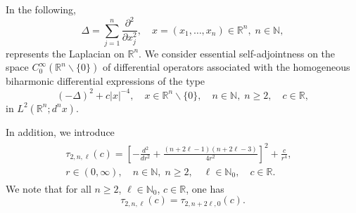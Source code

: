 \documentclass[reqno,11pt,centertags]{amsart}
\newcommand{\bbN}{{\mathbb{N}}}
\newcommand{\bbR}{{\mathbb{R}}}
\newcommand{\<}{\langle}
\renewcommand{\>}{\rangle}
\newcommand{\lb}{\label}
\numberwithin{equation}{section}
\theoremstyle{definition}
\begin{document}
In the following, 
\begin{equation}
\Delta= \sum_{j=1}^n \frac{\partial^2}{\partial x_j^2}, \quad x=(x_1,\ldots,x_n) \in \bbR^n,\; n\in \bbN,
\end{equation}
represents the  Laplacian on $\bbR^n$.
We consider essential self-adjointness on the space $C_0^{\infty}(\bbR^n \backslash \{0\})$
of differential operators associated with the homogeneous biharmonic differential expressions  of the type
\begin{equation}
(-\Delta)^2 +c|x|^{-4}, \quad x\in \bbR^n \backslash \{0\}, \quad n \in \bbN, \; n\geq 2,\quad  c\in \bbR, 
\end{equation}
in $L^2(\bbR^n;d^nx)$. 

In addition, we introduce 
\begin{align} \lb{E:tau_nl}
\begin{split} 
\tau_{2,n,\ell}(c)= \left[- \frac{d^2}{dr^2} + \frac{(n + 2\ell - 1)(n+2\ell-3)}{4r^2}\right]^2+\frac{c}{r^4},&    \\
r \in (0,\infty), \quad n \in \bbN, \; n \geq 2, \quad \ell\in \bbN_0, \quad c\in \bbR.&
\end{split} 
\end{align}
We note that for all $n \geq 2$, $\ell\in \bbN_0$, $c\in \bbR$, one has 
\begin{equation}\label{E:tau_n+2l,0}
\tau_{2,n,\ell}(c) = \tau_{2,n+2\ell,0}(c).
\end{equation}
\end{document}

